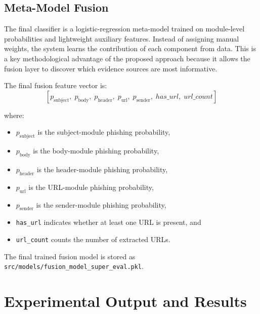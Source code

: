 \subsection{Meta-Model Fusion}
The final classifier is a logistic-regression meta-model trained on module-level probabilities and lightweight auxiliary features. Instead of assigning manual weights, the system learns the contribution of each component from data. This is a key methodological advantage of the proposed approach because it allows the fusion layer to discover which evidence sources are most informative.

The final fusion feature vector is:
\[
[p_{\text{subject}},\; p_{\text{body}},\; p_{\text{header}},\; p_{\text{url}},\; p_{\text{sender}},\; has\_url,\; url\_count]
\]

where:
\begin{itemize}
  \item $p_{\text{subject}}$ is the subject-module phishing probability,
  \item $p_{\text{body}}$ is the body-module phishing probability,
  \item $p_{\text{header}}$ is the header-module phishing probability,
  \item $p_{\text{url}}$ is the URL-module phishing probability,
  \item $p_{\text{sender}}$ is the sender-module phishing probability,
  \item \texttt{has\_url} indicates whether at least one URL is present, and
  \item \texttt{url\_count} counts the number of extracted URLs.
\end{itemize}

The final trained fusion model is stored as \texttt{src/models/fusion\_model\_super\_eval.pkl}.

\section{Experimental Output and Results}

